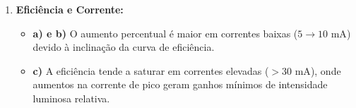\documentclass[a4paper,12pt]{article}
\begin{document}
\begin{enumerate}[label=\textbf{Questão \arabic*:}, leftmargin=*]
    \item \textbf{Eficiência e Corrente:} 
    \begin{itemize}
        \item \textbf{a) e b)} O aumento percentual é maior em correntes baixas ($5 \to 10\text{ mA}$) devido à inclinação da curva de eficiência. 
        \item \textbf{c)} A eficiência tende a saturar em correntes elevadas ($> 30\text{ mA}$), onde aumentos na corrente de pico geram ganhos mínimos de intensidade luminosa relativa.
    \end{itemize}

\end{enumerate}
\end{document}
